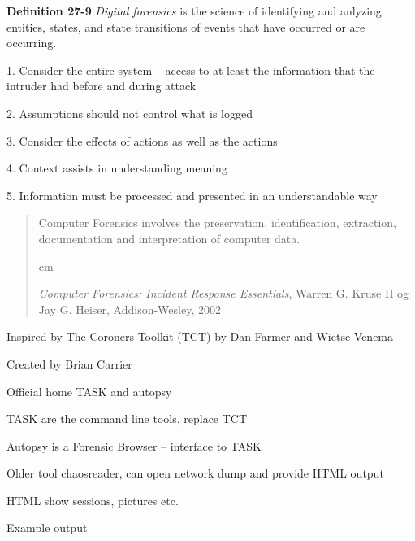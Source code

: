 \documentclass[Screen16to9,17pt]{foils}
\begin{document}
\begin{list2}
\item {\bf Definition 27-9} \emph{Digital forensics} is the science of identifying and anlyzing entities, states, and state transitions of events that have occurred or are occurring.
\item 1. Consider the entire system -- access to at least the information that the intruder had before and during attack
\item 2. Assumptions should not control what is logged
\item 3. Consider the effects of actions as well as the actions
\item 4. Context assists in understanding meaning
\item 5. Information must be processed and presented in an understandable way
\end{list2}



\vskip 4cm

\begin{quote}
{\hlkbig
Computer Forensics involves the preservation, identification,
extraction, documentation and interpretation of computer data.}

 cm

\emph{Computer Forensics: Incident Response Essentials}, Warren
G. Kruse II og Jay G. Heiser, Addison-Wesley, 2002
\end{quote}




\begin{list1}
\item Inspired by The Coroners Toolkit (TCT) by  Dan Farmer and Wietse Venema
\item Created by Brian Carrier
\item Official home TASK and autopsy 
\item TASK are the command line tools, replace TCT
\item Autopsy is a Forensic Browser -- interface to TASK
\end{list1}




\begin{list1}
\item Older tool chaosreader, can open network dump and provide HTML output
\item HTML show sessions, pictures etc.
\item {}
\item Example output 
\end{list1}
\end{document}
